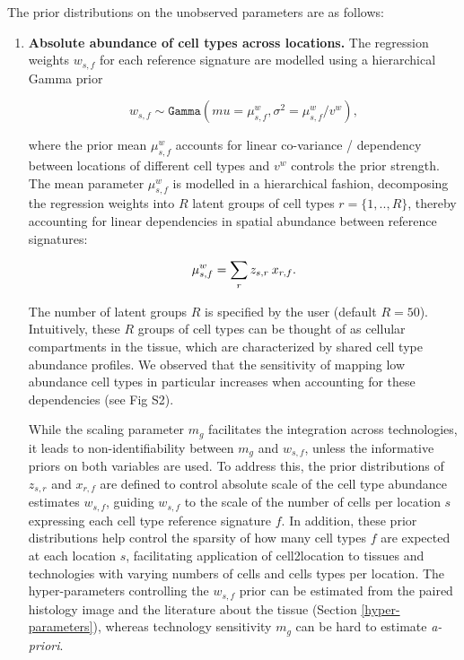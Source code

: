 \documentclass[11pt,a4paper]{article}
\begin{document}
The prior distributions on the unobserved parameters are as follows:
\begin{enumerate}
    \item \textbf{Absolute abundance of cell types across locations.}
    The regression weights $w_{s,f}$ for each reference signature are modelled using a hierarchical Gamma prior 
    
    \begin{linenomath*} \begin{equation} \label{eq:c2l:4}
    w_{s,f} \sim \mathtt{Gamma}(mu = {\mu}^{w}_{s,f}, \sigma^2 = {\mu}^{w}_{s,f} / v^{w}),
    \end{equation} \end{linenomath*}
    
    where the prior mean $\mu^{w}_{s,f}$ accounts for linear co-variance / dependency between locations of different cell types and $v^{w}$ controls the prior strength.
    The mean parameter ${\mu}^{w}_{s,f}$ is modelled in a hierarchical fashion, decomposing the regression weights into $R$ latent groups of cell types $r=\{1,..,R\}$, thereby accounting for linear dependencies in spatial abundance between reference signatures: 
    
    \begin{linenomath*} \begin{equation} \label{eq:c2l:5}
    {\mu}^{w}_{s,f} = \sum_{r} {z_{s,r} \: x_{r,f}}.\\
    \end{equation} \end{linenomath*}
    
    The number of latent groups $R$ is specified by the user (default $R=50$). Intuitively, these $R$ groups of cell types can be thought of as cellular compartments in the tissue, which are characterized by shared cell type abundance profiles. 
    We observed that the sensitivity of mapping low abundance cell types in particular increases when accounting for these dependencies (see Fig S2).
    
    While the scaling parameter $m_g$ facilitates the integration across technologies, it leads to non-identifiability between $m_g$ and $w_{s,f}$, unless the informative priors on both variables are used. To address this, the prior distributions of $z_{s,r}$ and $x_{r,f}$ are defined to control absolute scale of the cell type abundance estimates $w_{s,f}$, guiding $w_{s,f}$ to the scale of the number of cells per location $s$ expressing each cell type reference signature $f$. In addition, these prior distributions help control the sparsity of how many cell types $f$ are expected at each location $s$, facilitating application of cell2location to tissues and technologies with varying numbers of cells and cells types per location. The hyper-parameters controlling the $w_{s,f}$ prior can be estimated from the paired histology image and the literature about the tissue (Section \ref{hyper-parameters}), whereas technology sensitivity $m_g$ can be hard to estimate \textit{a-priori}.
    

\end{enumerate}
\end{document}

